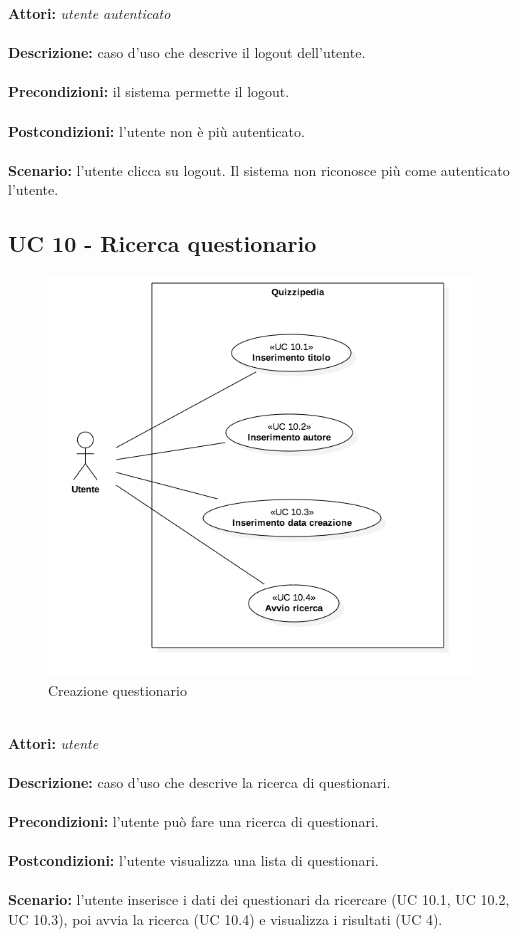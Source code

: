 \documentclass[a4paper,11pt]{article}
\begin{document}
\textbf{Attori:} \textit{utente autenticato}
\\ \\
\textbf{Descrizione:} caso d'uso che descrive il logout dell'utente.\\
\\
\textbf{Precondizioni:} il sistema permette il logout.\\
\\
\textbf{Postcondizioni:} l’utente non è più autenticato.\\
\\
\textbf{Scenario:} l’utente clicca su logout. Il sistema non riconosce più come autenticato l'utente.\\


\newpage
\subsection{UC 10 - Ricerca questionario}

\begin{figure}[h!]
\centering
\includegraphics[scale=0.60]{../immagini/UC10.png}
\caption{Creazione questionario}
\end{figure}
\ \\
\textbf{Attori:} \textit{utente}
\\ \\
\textbf{Descrizione:} caso d'uso che descrive la ricerca di questionari.\\
\\
\textbf{Precondizioni:} l'utente può fare una ricerca di questionari.\\
\\
\textbf{Postcondizioni:} l’utente visualizza una lista di questionari.\\
\\
\textbf{Scenario:} l’utente inserisce i dati dei questionari da ricercare (UC 10.1, UC 10.2, UC 10.3), poi avvia la ricerca (UC 10.4) e visualizza i risultati (UC 4).\\
\end{document}
